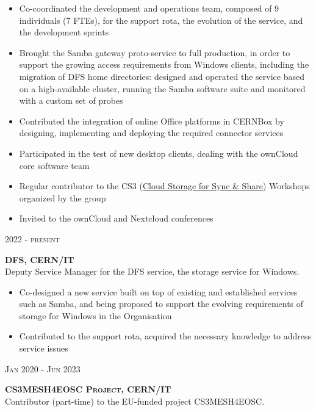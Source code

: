 \documentclass[11pt]{article}
\renewcommand{\subsection}[2]%
        {
         {\bf{\raggedright \scshape #1}}{\bf{\hfill \scshape #2}}\\[-.7\baselineskip]
}
\newenvironment{CompactItemize} {
  \begin{itemize}
  \setlength{\itemsep}{-3pt}
  \setlength{\parsep}{0pt}
  \setlength{\topsep}{-2pt}
  \setlength{\partopsep}{-2pt}
} {\end{itemize}}
\begin{document}
\begin{CompactItemize}
\item Co-coordinated the development and operations team, composed of 9 individuals (7 FTEs), for the support rota, the evolution of the service, and the development sprints
\item Brought the Samba gateway proto-service to full production, in order to support the growing access requirements from Windows clients, including the migration of DFS home directories: designed and operated the service based on a high-available cluster, running the Samba software suite and monitored with a custom set of probes
\item Contributed the integration of online Office platforms in CERNBox by designing, implementing and deploying the required connector services
\item Participated in the test of new desktop clients, dealing with the ownCloud core software team
\item Regular contributor to the CS3 (\href{https://www.cs3community.org/}{Cloud Storage for Sync \& Share}) Workshops organized by the group
\item Invited to the ownCloud and Nextcloud conferences
\end{CompactItemize}

\subsection{2022 - present}{DFS, CERN/IT}

Deputy Service Manager for the DFS service, the storage service for Windows.

\begin{CompactItemize}
\item Co-designed a new service built on top of existing and established services such as Samba, and being proposed to support the evolving requirements of storage for Windows in the Organisation
\item Contributed to the support rota, acquired the necessary knowledge to address service issues
\end{CompactItemize}

\subsection{Jan 2020 - Jun 2023}{CS3MESH4EOSC Project, CERN/IT}

Contributor (part-time) to the EU-funded project CS3MESH4EOSC.
\end{document}

